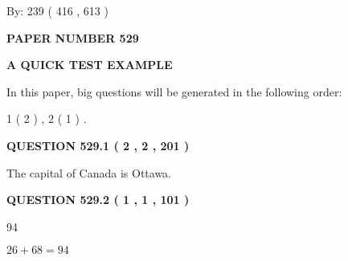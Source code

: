 \documentclass[12pt]{article}
\begin{document}
   
\hspace{1.0in} By: 
 239 ( 416 ,  613 )
   
   
   
   
\newpage 
\setcounter{page}{ 
   529001 } 
   
   
   
   
 {\textbf{ \Large{ PAPER NUMBER  529  }}}
   
   
\vspace{0.2in}
   
   
   
   
   
   
 \vspace{0.2in}
{\LARGE {\textbf{ A QUICK TEST EXAMPLE}}}
   
   
   
\vspace{0.2in}
   
In this paper, big questions will be generated in the following order: 
   
   
   1 ( 2 )
 ,
   2 ( 1 )
 .
  
\vspace{0.2in}
  
{\textbf{\Large{QUESTION
529.1 
 ( 2 , 2 , 201 )
}}}
  
  
 
 
\noindent{}
 
 
The capital of Canada is Ottawa.
 
 
 
 
  
\vspace{0.2in}
  
{\textbf{\Large{QUESTION
529.2 
 ( 1 , 1 , 101 )
}}}
  
  
 
 
\noindent{}

94
 
 
 
 
\noindent{}

$ %
26 +  %
68=   %
94$
 
 
   
   
 \vspace{0.2in}
 
\end{document}
